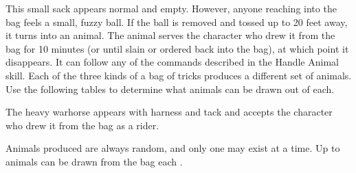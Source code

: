  This small sack appears normal and empty. However, anyone reaching into the bag feels a small, fuzzy ball. If the ball is removed and tossed up to 20 feet away, it turns into an animal. The animal serves the character who drew it from the bag for 10 minutes (or until slain or ordered back into the bag), at which point it disappears. It can follow any of the commands described in the Handle Animal skill. Each of the three kinds of a bag of tricks produces a different set of animals. Use the following tables to determine what animals can be drawn out of each.

The heavy warhorse appears with harness and tack and accepts the character who drew it from the bag as a rider.

Animals produced are always random, and only one may exist at a time. Up to  animals can be drawn from the bag each .

